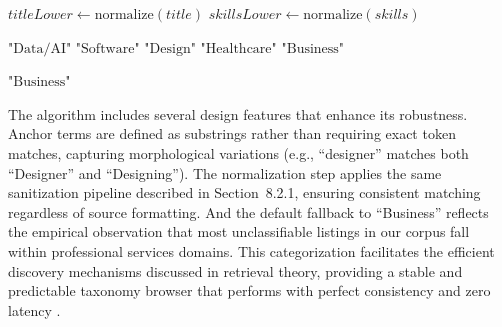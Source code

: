 \begin{algorithm}[H]
\caption{Heuristic Role Categorization}
\label{alg:categorize_job}
\begin{algorithmic}[1]
    \State $titleLower \gets \text{normalize}(title)$
    \State $skillsLower \gets \text{normalize}(skills)$

        \State \Return $\text{"Data/AI"}$
    \EndIf
        \State \Return $\text{"Software"}$
    \EndIf
        \State \Return $\text{"Design"}$
    \EndIf
        \State \Return $\text{"Healthcare"}$
    \EndIf
        \State \Return $\text{"Business"}$
    \EndIf

    \State \Return $\text{"Business"}$ 
\EndProcedure
\end{algorithmic}
\end{algorithm}

The algorithm includes several design features that enhance its robustness. Anchor terms are defined as substrings rather than requiring exact token matches, capturing morphological variations (e.g., ``designer'' matches both ``Designer'' and ``Designing''). The normalization step applies the same sanitization pipeline described in Section~8.2.1, ensuring consistent matching regardless of source formatting. And the default fallback to ``Business'' reflects the empirical observation that most unclassifiable listings in our corpus fall within professional services domains. This categorization facilitates the efficient discovery mechanisms discussed in retrieval theory, providing a stable and predictable taxonomy browser that performs with perfect consistency and zero latency \cite{baeza2011modern, croft2010search}.

